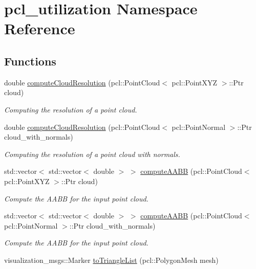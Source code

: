 \hypertarget{namespacepcl__utilization}{}\section{pcl\+\_\+utilization Namespace Reference}
\label{namespacepcl__utilization}
\subsection*{Functions}
\begin{DoxyCompactItemize}
\item 
double \hyperlink{namespacepcl__utilization_ac199fc2120c5dce78fd87c2c1e0445d0}{compute\+Cloud\+Resolution} (pcl\+::\+Point\+Cloud$<$ pcl\+::\+Point\+X\+YZ $>$\+::Ptr cloud)
\begin{DoxyCompactList}\small\item\em Computing the resolution of a point cloud. \end{DoxyCompactList}\item 
double \hyperlink{namespacepcl__utilization_a5fd7d53d77802f39bdec1098137e198a}{compute\+Cloud\+Resolution} (pcl\+::\+Point\+Cloud$<$ pcl\+::\+Point\+Normal $>$\+::Ptr cloud\+\_\+with\+\_\+normals)
\begin{DoxyCompactList}\small\item\em Computing the resolution of a point cloud with normals. \end{DoxyCompactList}\item 
std\+::vector$<$ std\+::vector$<$ double $>$ $>$ \hyperlink{namespacepcl__utilization_a21484054fe6624a5c1b6fad0c033ad95}{compute\+A\+A\+BB} (pcl\+::\+Point\+Cloud$<$ pcl\+::\+Point\+X\+YZ $>$\+::Ptr cloud)
\begin{DoxyCompactList}\small\item\em Compute the A\+A\+BB for the input point cloud. \end{DoxyCompactList}\item 
std\+::vector$<$ std\+::vector$<$ double $>$ $>$ \hyperlink{namespacepcl__utilization_ad21b81d1b10d9b0ba6c7a41488c01ada}{compute\+A\+A\+BB} (pcl\+::\+Point\+Cloud$<$ pcl\+::\+Point\+Normal $>$\+::Ptr cloud\+\_\+with\+\_\+normals)
\begin{DoxyCompactList}\small\item\em Compute the A\+A\+BB for the input point cloud. \end{DoxyCompactList}\item 
visualization\+\_\+msgs\+::\+Marker \hyperlink{namespacepcl__utilization_a051f0954371074c7331ba054d185950f}{to\+Triangle\+List} (pcl\+::\+Polygon\+Mesh mesh)

\end{DoxyCompactItemize}
